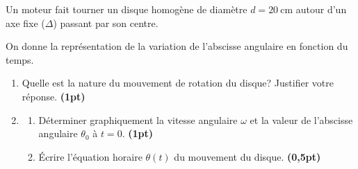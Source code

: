\begin{minipage}{0.58\linewidth}
    Un moteur fait tourner un disque homogène de diamètre ${d=\qty{20}{\cm}}$
    autour d'un axe fixe ($\Delta$) passant par son centre.
    
    On donne la représentation de la variation de l'abscisse angulaire en
    fonction du temps.

    \begin{enumerate}
    \item Quelle est la nature du mouvement de rotation du disque? Justifier
          votre réponse. \textbf{(1pt)}
    \item
          \begin{enumerate}
              \item Déterminer graphiquement la vitesse angulaire $\omega$ et la
                    valeur de l'abscisse angulaire $\theta_{0}$ à $t=0$.
                    \textbf{(1pt)}
              \item Écrire l'équation horaire $\theta(t)$ du mouvement du
                    disque. \textbf{(0,5pt)}
          \end{enumerate}
    \end{enumerate}
\end{minipage}
\hfill
\begin{minipage}{0.40\linewidth}
        \flushright
\end{minipage}

